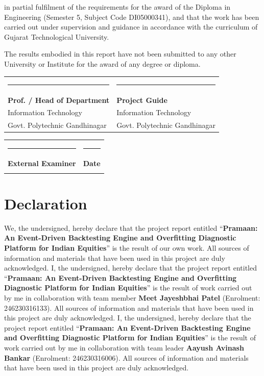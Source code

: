 \documentclass[12pt,a4paper,oneside]{report}
\newcommand{\copyMode}{0}
\begin{document}
in partial fulfilment of the requirements for the award of the Diploma in Engineering
(Semester 5, Subject Code DI05000341), and that the work has been carried out under
supervision and guidance in accordance with the curriculum of Gujarat Technological
University.

The results embodied in this report have not been submitted to any other University
or Institute for the award of any degree or diploma.

\vspace{2.5cm}

\begin{flushleft}
\begin{tabular}{@{}p{7cm}p{6cm}@{}}
\rule{6cm}{0.4pt} & \rule{6cm}{0.4pt} \\
\textbf{Prof. / Head of Department} & \textbf{Project Guide} \\
Information Technology & Information Technology \\
Govt. Polytechnic Gandhinagar & Govt. Polytechnic Gandhinagar \\
\end{tabular}

\vspace{2cm}

\begin{tabular}{@{}p{7cm}p{6cm}@{}}
\rule{6cm}{0.4pt} & \rule{6cm}{0.4pt} \\
\textbf{External Examiner} & \textbf{Date} \\
 & \\
\end{tabular}
\end{flushleft}

\chapter*{Declaration}
\thispagestyle{plain}

\vspace{1cm}

\ifcase\copyMode
We, the undersigned, hereby declare that the project report entitled
``\textbf{Pramaan: An Event-Driven Backtesting Engine and Overfitting Diagnostic
Platform for Indian Equities}'' is the result of our own work. All sources of
information and materials that have been used in this project are duly
acknowledged.
\or
I, the undersigned, hereby declare that the project report entitled
``\textbf{Pramaan: An Event-Driven Backtesting Engine and Overfitting Diagnostic
Platform for Indian Equities}'' is the result of work carried out by me in
collaboration with team member \textbf{Meet Jayeshbhai Patel} (Enrolment: 246230316133).
All sources of information and materials that have been used in this project are duly
acknowledged.
\or
I, the undersigned, hereby declare that the project report entitled
``\textbf{Pramaan: An Event-Driven Backtesting Engine and Overfitting Diagnostic
Platform for Indian Equities}'' is the result of work carried out by me in
collaboration with team leader \textbf{Aayush Avinash Bankar} (Enrolment: 246230316006).
All sources of information and materials that have been used in this project are duly
acknowledged.
\fi
\end{document}
